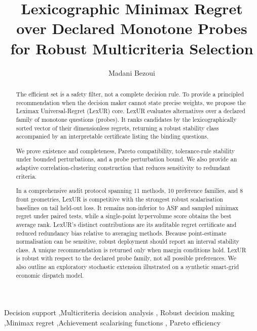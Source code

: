 \documentclass[review]{elsarticle}
\theoremstyle{remark}
\begin{document}
\begin{frontmatter}
\title{\textbf{Lexicographic Minimax Regret over Declared Monotone Probes\\
for Robust Multicriteria Selection}}
\author{Madani Bezoui}
\address{CESI LINEACT, UR 7527}
\begin{abstract}
The efficient set is a safety filter, not a complete decision rule. To provide a principled recommendation when the decision maker cannot state precise weights, we propose the Leximax Universal-Regret (LexUR) core. LexUR evaluates alternatives over a declared family of monotone questions (probes). It ranks candidates by the lexicographically sorted vector of their dimensionless regrets, returning a robust stability class accompanied by an interpretable certificate listing the binding questions.

We prove existence and completeness, Pareto compatibility, tolerance-rule stability under bounded perturbations, and a probe perturbation bound. We also provide an adaptive correlation-clustering construction that reduces sensitivity to redundant criteria.

In a comprehensive audit protocol spanning 11 methods, 10 preference families, and 8 front geometries, LexUR is competitive with the strongest robust scalarisation baselines on tail held-out loss. It remains non-inferior to ASF and sampled minimax regret under paired tests, while a single-point hypervolume score obtains the best average rank. LexUR's distinct contributions are its auditable regret certificate and reduced redundancy bias relative to averaging methods. Because point-estimate normalisation can be sensitive, robust deployment should report an interval stability class. A unique recommendation is returned only when margin conditions hold. LexUR is robust with respect to the declared probe family, not all possible preferences. We also outline an exploratory stochastic extension illustrated on a synthetic smart-grid economic dispatch model.
\end{abstract}

\begin{keyword}
Decision support \sep Multicriteria decision analysis \sep
Robust decision making \sep Minimax regret \sep Achievement scalarising functions \sep
Pareto efficiency
\end{keyword}
\end{frontmatter}














\appendix



\end{document}
